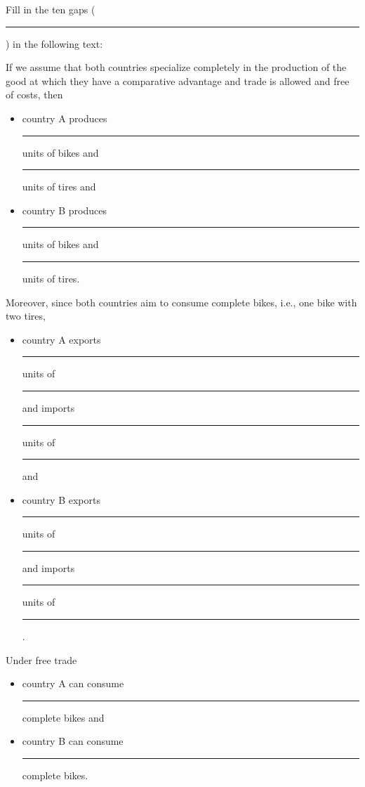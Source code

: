 {{{			\item Fill in the ten gaps (\rule{5em}{.4mm}) in the following text:
			
			If we assume that both countries specialize completely in the production of the good at which they have a comparative advantage and trade is allowed and free of costs, then 
			\begin{itemize}
				\item
				country A produces \rule{5em}{.4mm} units of bikes and \rule{5em}{.4mm} units of tires and
				\item 
				country B produces \rule{5em}{.4mm} units of bikes and \rule{5em}{.4mm} units of tires.
			\end{itemize}
			Moreover, since both countries aim to consume complete bikes, i.e., one bike with two tires,
			\begin{itemize}
				\item
				country A exports \rule{4em}{.4mm} units of \rule{4em}{.4mm} and imports \rule{4em}{.4mm} units of \rule{4em}{.4mm} and 
				\item 
				country B exports \rule{4em}{.4mm} units of \rule{4em}{.4mm} and imports \rule{4em}{.4mm} units of \rule{4em}{.4mm}.
			\end{itemize}
			Under free trade 
			\begin{itemize}
				\item country A can consume \rule{5em}{.4mm} complete bikes and 
				\item country B can consume \rule{5em}{.4mm} complete bikes.
			\end{itemize}
			
	}}
	
}
